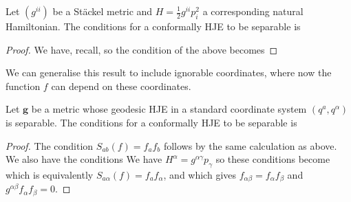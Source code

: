 \documentclass{article}
\begin{document}
\begin{lemma}
	Let $(g^{ii})$ be a St\"ackel metric and $H = \frac{1}{2}g^{ii}p_i^2$ a corresponding natural Hamiltonian. The conditions for a conformally HJE to be separable is 
\end{lemma}
\begin{proof}
	We have, recall, 
so the condition of the above becomes 
\end{proof}

We can generalise this result to include ignorable coordinates, where now the function $f$ can depend on these coordinates. 

\begin{prop}
	Let $\bm{g}$ be a metric whose geodesic HJE in a standard coordinate system $(q^a,q^\alpha)$ is separable. The conditions for a conformally HJE to be separable is 
\end{prop}
\begin{proof}
	The condition $S_{ab}(f) = f_a f_b$ follows by the same calculation as above. We also have the conditions 
We have $H^\alpha = g^{\alpha\gamma}p_\gamma$ so these conditions become 
which is equivalently $S_{a\alpha}(f) = f_a f_\alpha$, and 
which gives $f_{\alpha\beta}=f_\alpha f_\beta$ and $g^{\alpha\beta}f_{\alpha} f_\beta=0$.
\end{proof}
\end{document}
